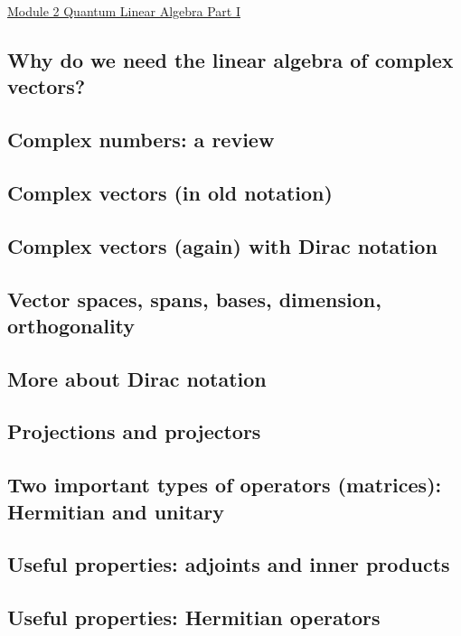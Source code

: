 \documentclass[main.tex]{subfiles}
\begin{document}
\href{https://www2.seas.gwu.edu/~simhaweb/quantum/modules/module2/module2.html}{Module 2 Quantum Linear Algebra Part I}

\subsection{Why do we need the linear algebra of complex vectors?}

\subsection{Complex numbers: a review}

\subsection{Complex vectors (in old notation)}

\subsection{Complex vectors (again) with Dirac notation}

\subsection{Vector spaces, spans, bases, dimension, orthogonality}

\subsection{More about Dirac notation}

\subsection{Projections and projectors}

\subsection{Two important types of operators (matrices): Hermitian and unitary}

\subsection{Useful properties: adjoints and inner products}

\subsection{Useful properties: Hermitian operators}
\end{document}
